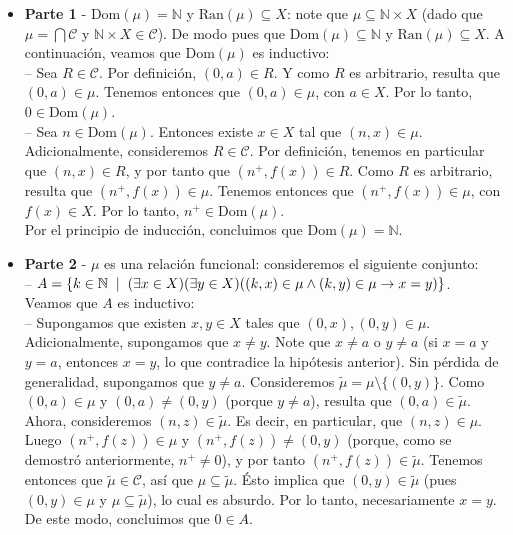 \documentclass[10 pt]{article}
\begin{document}
\begin{itemize}
    \item \Large{\textbf{Parte 1} - $\text{Dom}(\mu)=\mathbb N$ y $\text{Ran}(\mu) \subseteq X$: note que $\mu \subseteq \mathbb N \times X$ (dado que $\mu=\bigcap \mathcal{C}$ y $\mathbb N \times X \in \mathcal C$). De modo pues que $\text{Dom}(\mu) \subseteq \mathbb N$ y $\text{Ran}(\mu) \subseteq X$. A continuación, veamos que $\text{Dom}(\mu)$ es inductivo: \\
    
    -- Sea $R \in \mathcal C$. Por definición, $(0,a) \in R$. Y como $R$ es arbitrario, resulta que $(0,a) \in \mu$. Tenemos entonces que $(0,a) \in \mu$, con $a \in X$. Por lo tanto, $0 \in \text{Dom}(\mu)$. \\

    -- Sea $n \in \text{Dom}(\mu)$. Entonces existe $x \in X$ tal que $(n,x) \in \mu$. Adicionalmente, consideremos $R \in \mathcal{C}$. Por definición, tenemos en particular que $(n,x) \in R$, y por tanto que $(n^+,f(x)) \in R$. Como $R$ es arbitrario, resulta que $(n^+,f(x)) \in \mu$. Tenemos entonces que $(n^+,f(x)) \in \mu$, con $f(x) \in X$. Por lo tanto, $n^+ \in \text{Dom}(\mu)$. \\

    Por el principio de inducción, concluimos que $\text{Dom}(\mu)=\mathbb N$.} \\

    \item \Large{\textbf{Parte 2} - $\mu$ es una relación funcional: consideremos el siguiente conjunto: \\

    -- $A=\{k \in \mathbb N \hspace{0.2 cm}|\hspace{0.2 cm}(\exists x \in X)(\exists y \in X)((k,x) \in \mu \land (k,y) \in \mu \rightarrow x=y)\}$. \\

    Veamos que $A$ es inductivo: \\

    -- Supongamos que existen $x,y \in X$ tales que $(0,x),(0,y) \in \mu$. Adicionalmente, supongamos que $x \neq y$. Note que $x \neq a$ o $y \neq a$ (si $x=a$ y $y=a$, entonces $x=y$, lo que contradice la hipótesis anterior). Sin pérdida de generalidad, supongamos que $y \neq a$. Consideremos $\tilde{\mu}=\mu \setminus \{(0,y)\}$. Como $(0,a) \in \mu$ y $(0,a) \neq (0,y)$ (porque $y \neq a$), resulta que $(0,a) \in \tilde{\mu}$. Ahora, consideremos $(n,z) \in \tilde{\mu}$. Es decir, en particular, que $(n,z) \in \mu$. Luego $(n^+,f(z)) \in \mu$ y $(n^+,f(z)) \neq (0,y)$ (porque, como se demostró anteriormente, $n^+ \neq 0$), y por tanto $(n^+,f(z)) \in \tilde{\mu}$. Tenemos entonces que $\tilde{\mu} \in \mathcal C$, así que $\mu \subseteq \tilde{\mu}$. Ésto implica que $(0,y) \in \tilde{\mu}$ (pues $(0,y) \in \mu$ y $\mu \subseteq \tilde{\mu}$), lo cual es absurdo. Por lo tanto, necesariamente $x=y$. De este modo, concluimos que $0 \in A$. \\

}
\end{itemize}
\end{document}
